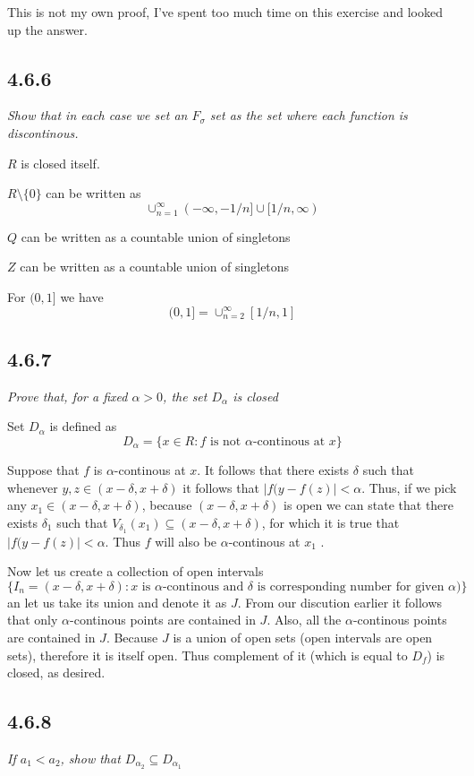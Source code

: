 \documentclass[11pt,oneside,titlepage]{book}
\begin{document}
This is not my own proof, I've spent too much time on this exercise and looked
up the answer.


\subsection*{4.6.6}
\textit{Show that in each case we set an $F_\sigma$ set as the set where
  each function is discontinous.}

$R$ is closed itself.

$R \setminus \{0\}$ can be written as
$$\cup_{n=1}^{\infty} (-\infty, -1/n] \cup [1/n, \infty)$$

$Q$ can be written as a countable union of singletons

$Z$ can be written as a countable union of singletons

For $(0, 1]$ we have 
$$(0, 1] = \cup_{n = 2}^{\infty} [1/n, 1]$$

\subsection*{4.6.7}
\textit{Prove that, for a fixed $\alpha > 0$, the set $D_\alpha$ is closed}

Set $D_\alpha$ is defined as
$$D_\alpha = \{x \in R: f \text{ is not }\alpha\text{-continous at }x\}$$

Suppose that $f$ is $\alpha$-continous at $x$. It follows that there exists
$\delta$ such that whenever $y, z \in (x - \delta, x + \delta)$ it follows that
$|f(y - f(z)| < \alpha$. Thus, if we pick any
$x_1 \in (x - \delta, x + \delta)$, because $(x - \delta, x + \delta)$ is open
we can state that there exists $\delta_1$ such that
$V_{\delta_1}(x_1) \subseteq (x -\delta, x + \delta)$, for which it is
true that $|f(y - f(z)| < \alpha$. Thus $f$ will  
 also be $\alpha$-continous at  $x_1$ .

Now let us create a collection of open intervals
$$\{I_n = (x - \delta, x + \delta): x \text{ is $\alpha$-continous and
  $\delta$ is corresponding number for given $\alpha$})\}$$
an let us take its union and denote it as $J$. From our discution earlier
it follows that only $\alpha$-continous points are contained in $J$.
Also, all the $\alpha$-continous points are contained in $J$.
Because $J$ is a union of open sets (open intervals are open sets), therefore
it is itself open. Thus complement of it (which is equal to $D_f$) is closed,
as desired.

\subsection*{4.6.8}
\textit{If $a_1 < a_2$, show that $D_{\alpha_2} \subseteq D_{\alpha_1}$}
\end{document}

